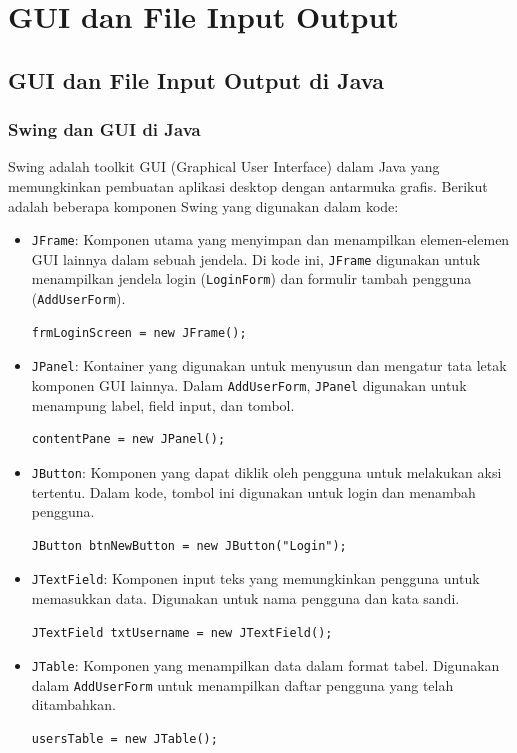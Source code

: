 \chapter{GUI dan File Input Output}

\section{GUI dan File Input Output di Java}

\subsection{Swing dan GUI di Java}

Swing adalah toolkit GUI (Graphical User Interface) dalam Java yang memungkinkan pembuatan aplikasi desktop dengan antarmuka grafis. Berikut adalah beberapa komponen Swing yang digunakan dalam kode:

\begin{itemize}
\item \texttt{JFrame}: Komponen utama yang menyimpan dan menampilkan elemen-elemen GUI lainnya dalam sebuah jendela. Di kode ini, \texttt{JFrame} digunakan untuk menampilkan jendela login (\texttt{LoginForm}) dan formulir tambah pengguna (\texttt{AddUserForm}).
\begin{lstlisting}[style=JavaStyle]
	frmLoginScreen = new JFrame();
\end{lstlisting}

\item \texttt{JPanel}: Kontainer yang digunakan untuk menyusun dan mengatur tata letak komponen GUI lainnya. Dalam \texttt{AddUserForm}, \texttt{JPanel} digunakan untuk menampung label, field input, dan tombol.
\begin{lstlisting}[style=JavaStyle]
	contentPane = new JPanel();
\end{lstlisting}

\item \texttt{JButton}: Komponen yang dapat diklik oleh pengguna untuk melakukan aksi tertentu. Dalam kode, tombol ini digunakan untuk login dan menambah pengguna.
\begin{lstlisting}[style=JavaStyle]
	JButton btnNewButton = new JButton("Login");
\end{lstlisting}

\item \texttt{JTextField}: Komponen input teks yang memungkinkan pengguna untuk memasukkan data. Digunakan untuk nama pengguna dan kata sandi.
\begin{lstlisting}[style=JavaStyle]
	JTextField txtUsername = new JTextField();
\end{lstlisting}

\item \texttt{JTable}: Komponen yang menampilkan data dalam format tabel. Digunakan dalam \texttt{AddUserForm} untuk menampilkan daftar pengguna yang telah ditambahkan.
\begin{lstlisting}[style=JavaStyle]
	usersTable = new JTable();
\end{lstlisting}
\end{itemize}

